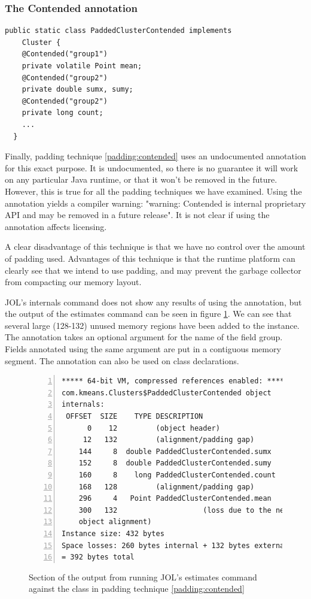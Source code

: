 \subsubsection{The Contended annotation}

\begin{padding}[h]
\begin{Verbatim}[frame=single]
  public static class PaddedClusterContended implements
    Cluster {
    @Contended("group1")
    private volatile Point mean;
    @Contended("group2")
    private double sumx, sumy;
    @Contended("group2")
    private long count;
    ...
  }
\end{Verbatim}
	\caption{}
	\label{padding:contended}
\end{padding}

Finally, padding technique \ref{padding:contended} uses an undocumented
annotation\\
 for this exact purpose. It is undocumented,
so there is no guarantee it will work on any particular Java runtime, or that it
won't be removed in the future. However, this is true for all the padding
techniques we have examined. Using the  annotation yields a
compiler warning: "warning: Contended is internal proprietary API and may be
removed in a future release". It is not clear if using the annotation affects
licensing.

A clear disadvantage of this technique is that we have no control over the
amount of padding used. Advantages of this technique is that the runtime
platform can clearly see that we intend to use padding, and may prevent the
garbage collector from compacting our memory layout.

JOL's internals command does not show any results of using the 
annotation, but the output of the estimates command can be seen in figure
\ref{jol:contended}. We can see that several large (128-132) unused memory
regions have been added to the instance. The annotation takes an optional
argument for the name of the field group. Fields annotated using the same
argument are put in a contiguous memory segment. The 
annotation can also be used on class declarations.

\begin{figure}[h]
\begin{Verbatim}[frame=single, numbers=left]
***** 64-bit VM, compressed references enabled: *****
com.kmeans.Clusters$PaddedClusterContended object
internals:
 OFFSET  SIZE    TYPE DESCRIPTION
      0    12         (object header)
     12   132         (alignment/padding gap)
    144     8  double PaddedClusterContended.sumx
    152     8  double PaddedClusterContended.sumy
    160     8    long PaddedClusterContended.count
    168   128         (alignment/padding gap)
    296     4   Point PaddedClusterContended.mean
    300   132                    (loss due to the next
    object alignment)
Instance size: 432 bytes
Space losses: 260 bytes internal + 132 bytes external
= 392 bytes total
\end{Verbatim}
	\caption{Section of the output from running JOL's estimates command
	against the
	 class in padding technique
	\ref{padding:contended}}
	\label{jol:contended}
\end{figure}
